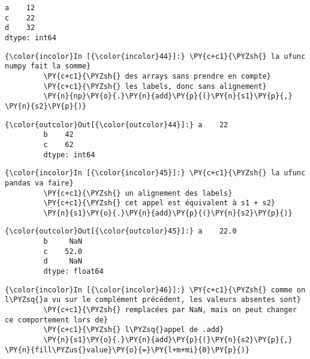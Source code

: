     \begin{Verbatim}[commandchars=\\\{\},frame=single,framerule=0.3mm,rulecolor=\color{cellframecolor}]
a    12
c    22
d    32
dtype: int64
\end{Verbatim}

    \begin{Verbatim}[commandchars=\\\{\},frame=single,framerule=0.3mm,rulecolor=\color{cellframecolor}]
{\color{incolor}In [{\color{incolor}44}]:} \PY{c+c1}{\PYZsh{} la ufunc numpy fait la somme}
         \PY{c+c1}{\PYZsh{} des arrays sans prendre en compte}
         \PY{c+c1}{\PYZsh{} les labels, donc sans alignement}
         \PY{n}{np}\PY{o}{.}\PY{n}{add}\PY{p}{(}\PY{n}{s1}\PY{p}{,} \PY{n}{s2}\PY{p}{)}
\end{Verbatim}


\begin{Verbatim}[commandchars=\\\{\},frame=single,framerule=0.3mm,rulecolor=\color{cellframecolor}]
{\color{outcolor}Out[{\color{outcolor}44}]:} a    22
         b    42
         c    62
         dtype: int64
\end{Verbatim}
            
    \begin{Verbatim}[commandchars=\\\{\},frame=single,framerule=0.3mm,rulecolor=\color{cellframecolor}]
{\color{incolor}In [{\color{incolor}45}]:} \PY{c+c1}{\PYZsh{} la ufunc pandas va faire}
         \PY{c+c1}{\PYZsh{} un alignement des labels}
         \PY{c+c1}{\PYZsh{} cet appel est équivalent à s1 + s2}
         \PY{n}{s1}\PY{o}{.}\PY{n}{add}\PY{p}{(}\PY{n}{s2}\PY{p}{)}
\end{Verbatim}


\begin{Verbatim}[commandchars=\\\{\},frame=single,framerule=0.3mm,rulecolor=\color{cellframecolor}]
{\color{outcolor}Out[{\color{outcolor}45}]:} a    22.0
         b     NaN
         c    52.0
         d     NaN
         dtype: float64
\end{Verbatim}
            
    \begin{Verbatim}[commandchars=\\\{\},frame=single,framerule=0.3mm,rulecolor=\color{cellframecolor}]
{\color{incolor}In [{\color{incolor}46}]:} \PY{c+c1}{\PYZsh{} comme on l\PYZsq{}a vu sur le complément précédent, les valeurs absentes sont}
         \PY{c+c1}{\PYZsh{} remplacées par NaN, mais on peut changer ce comportement lors de}
         \PY{c+c1}{\PYZsh{} l\PYZsq{}appel de .add}
         \PY{n}{s1}\PY{o}{.}\PY{n}{add}\PY{p}{(}\PY{n}{s2}\PY{p}{,} \PY{n}{fill\PYZus{}value}\PY{o}{=}\PY{l+m+mi}{0}\PY{p}{)}
\end{Verbatim}


